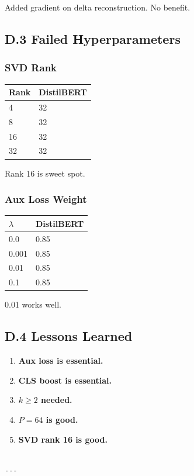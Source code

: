 Added gradient on delta reconstruction. No benefit.

\subsection{D.3 Failed Hyperparameters}

\subsubsection{SVD Rank}

\begin{table}[H]
\centering
\small
\begin{tabular}{ll}
\toprule
\textbf{Rank} & \textbf{DistilBERT} \\
\midrule
4 & 32 \\
8 & 32 \\
16 & 32 \\
32 & 32 \\
\bottomrule
\end{tabular}
\end{table}

Rank 16 is sweet spot.

\subsubsection{Aux Loss Weight}

\begin{table}[H]
\centering
\small
\begin{tabular}{ll}
\toprule
\textbf{$\lambda$} & \textbf{DistilBERT} \\
\midrule
0.0 & 0.85 \\
0.001 & 0.85 \\
0.01 & 0.85 \\
0.1 & 0.85 \\
\bottomrule
\end{tabular}
\end{table}

0.01 works well.

\subsection{D.4 Lessons Learned}

\begin{enumerate}
\item \textbf{Aux loss is essential.}
\item \textbf{CLS boost is essential.}
\item \textbf{$k \geq 2$ needed.}
\item \textbf{$P = 64$ is good.}
\item \textbf{SVD rank 16 is good.}
\end{enumerate}
\begin{lstlisting}

---
\end{lstlisting}

